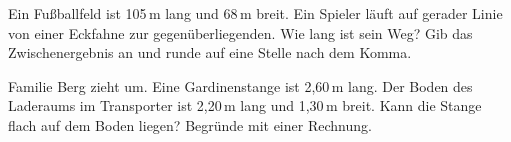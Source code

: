 \documentclass[11pt]{article}
\newcommand{\aufg}[3]{\par\noindent\makebox[0pt][r]{#3}\begin{minipage}[t]{\linewidth}#1\end{minipage}\par}
\newcommand{\nr}[1]{\makebox[7mm][l]{\textbf{#1}}}
\begin{document}
\medskip
\aufg{\nr{T3}Ein Fußballfeld ist 105\,m lang und 68\,m breit. Ein Spieler läuft auf gerader Linie von einer Eckfahne zur gegenüberliegenden. Wie lang ist sein Weg? Gib das Zwischenergebnis an und runde auf eine Stelle nach dem Komma.}{}{}
\medskip
\aufg{\nr{T4}Familie Berg zieht um. Eine Gardinenstange ist 2,60\,m lang. Der Boden des Laderaums im Transporter ist 2,20\,m lang und 1,30\,m breit. Kann die Stange flach auf dem Boden liegen? Begründe mit einer Rechnung.}{}{{\scriptsize\color{mbgrau}Ziel\hspace{2mm}}}
\medskip
\end{document}
